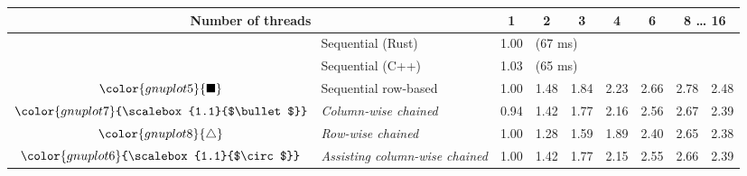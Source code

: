 \begin{tabular}{clrrrrrrr}
\toprule
\multicolumn{2}{c}{\textbf{Number of threads}} & \multicolumn{1}{c}{\textbf{ 1 }} & \multicolumn{1}{c}{\textbf{ 2 }} & \multicolumn{1}{c}{\textbf{ 3 }} & \multicolumn{1}{c}{\textbf{ 4 }} & \multicolumn{1}{c}{\textbf{ 6 }} & \multicolumn{2}{c}{\textbf{ 8 } \dots \textbf{ 16 }} \\
\midrule
& Sequential (Rust) & \multicolumn{1}{r}{ 1.00 } & \multicolumn{ 6 }{l}{(67 ms)} \\
& Sequential (C++) & \multicolumn{1}{r}{ 1.03 } & \multicolumn{ 6 }{l}{(65 ms)} \\
\rowcolor{gnuplot5!10}$\color{gnuplot5}{\blacksquare}$ & Sequential row-based & \cellcolor{gnuplot5!10} 1.00 & \cellcolor{gnuplot5!10} 1.48 & \cellcolor{gnuplot5!10} 1.84 & \cellcolor{gnuplot5!10} 2.23 & \cellcolor{gnuplot5!10} 2.66 & \cellcolor{gnuplot5!10} 2.78 & \cellcolor{gnuplot5!10} 2.48 \\
\rowcolor{gnuplot7!30}$\color{gnuplot7}{\scalebox{1.1}{$\bullet$}}$ & \textit{Column-wise chained} & \cellcolor{gnuplot7!30} 0.94 & \cellcolor{gnuplot7!30} 1.42 & \cellcolor{gnuplot7!30} 1.77 & \cellcolor{gnuplot7!30} 2.16 & \cellcolor{gnuplot7!30} 2.56 & \cellcolor{gnuplot7!30} 2.67 & \cellcolor{gnuplot7!30} 2.39 \\
\rowcolor{gnuplot8!30}$\color{gnuplot8}{\triangle}$ & \textit{Row-wise chained} & \cellcolor{gnuplot8!30} 1.00 & \cellcolor{gnuplot8!30} 1.28 & \cellcolor{gnuplot8!30} 1.59 & \cellcolor{gnuplot8!30} 1.89 & \cellcolor{gnuplot8!30} 2.40 & \cellcolor{gnuplot8!30} 2.65 & \cellcolor{gnuplot8!30} 2.38 \\
\rowcolor{gnuplot6!30}$\color{gnuplot6}{\scalebox{1.1}{$\circ$}}$ & \textit{Assisting column-wise chained} & \cellcolor{gnuplot6!30} 1.00 & \cellcolor{gnuplot6!30} 1.42 & \cellcolor{gnuplot6!30} 1.77 & \cellcolor{gnuplot6!30} 2.15 & \cellcolor{gnuplot6!30} 2.55 & \cellcolor{gnuplot6!30} 2.66 & \cellcolor{gnuplot6!30} 2.39 \\
\bottomrule
\end{tabular}
